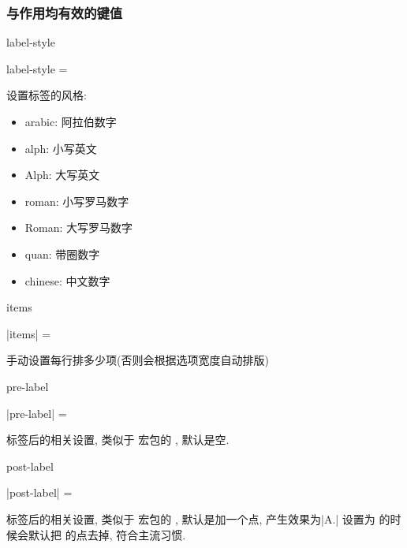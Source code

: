 \documentclass{l3doc}
\begin{document}
\begin{documentation}
\subsubsection{与作用均有效的键值}
\begin{function}[updated = 2022-01-11]{label-style}
  \begin{syntax}
    label-style =  
  \end{syntax}
  设置标签的风格: 
  \begin{itemize}
    \item arabic: 阿拉伯数字
    \item alph: 小写英文
    \item Alph: 大写英文
    \item roman: 小写罗马数字
    \item Roman: 大写罗马数字
    \item quan: 带圈数字
    \item chinese: 中文数字
  \end{itemize}
\end{function}


\begin{function}[updated = 2022-01-09]{items}
  \begin{syntax}
    |items| = 
  \end{syntax}
  手动设置每行排多少项(否则会根据选项宽度自动排版)
\end{function}

\begin{function}[updated = 2022-01-09]{pre-label}
  \begin{syntax}
    |pre-label| =  \init{{}}
  \end{syntax}
  标签后的相关设置, 类似于  宏包的 , 默认是空. 
\end{function}

\begin{function}[updated = 2022-01-09]{post-label}
  \begin{syntax}
    |post-label| =  
  \end{syntax}
  标签后的相关设置, 类似于  宏包的 , 默认是加一个点, 产生效果为|A.|
   设置为  的时候会默认把 的点去掉, 符合主流习惯.
\end{function}


\end{documentation}
\end{document}
